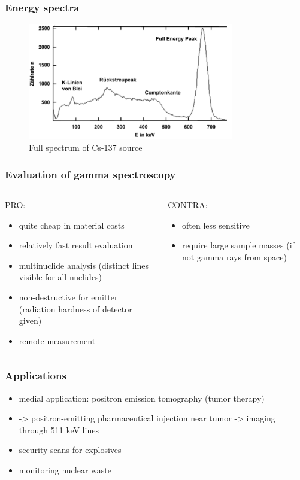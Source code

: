 \documentclass[aspectratio=1610, 12pt]{beamer}
\begin{document}
\begin{frame}\frametitle{Energy spectra}
  \begin{figure}
    \includegraphics[width=0.8\textwidth]{plots/full_spec.png}
    \caption{Full spectrum of Cs-137 source}
  \end{figure}
\end{frame}

\begin{frame}\frametitle{Evaluation of gamma spectroscopy}
  \begin{columns}
    \begin{column}[c]{0.48\textwidth}
      PRO:
      \begin{itemize}
        \item quite cheap in material costs
        \item relatively fast result evaluation
        \item multinuclide analysis (distinct lines visible for all nuclides)
        \item non-destructive for emitter (radiation hardness of detector given)
        \item remote measurement
      \end{itemize}
    \end{column}
    \begin{column}[c]{0.48\textwidth}
      CONTRA:
      \begin{itemize}
        \item often less sensitive
        \item require large sample masses (if not gamma rays from space)
      \end{itemize}
    \end{column}
  \end{columns}
\end{frame}

\begin{frame}\frametitle{Applications}
  \begin{itemize}
    \item medial application: positron emission tomography (tumor therapy)
    \item -> positron-emitting pharmaceutical injection near tumor -> imaging through 511 keV lines
    \item security scans for explosives
    \item monitoring nuclear waste
  \end{itemize}
\end{frame}
\end{document}
